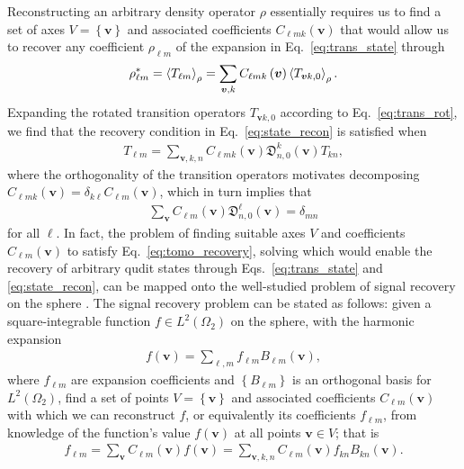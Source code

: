\documentclass[nofootinbib,notitlepage,twocolumn]{revtex4-2}
\newcommand{\p}[1]{\left(#1\right)} %
\renewcommand{\set}[1]{\left\{#1\right\}} %
\newcommand{\bk}{\Braket} %
\renewcommand{\v}{\bm} %
\newcommand{\1}{\mathds{1}}
\newcommand{\D}{\mathfrak{D}}
\begin{document}
Reconstructing an arbitrary density operator $\rho$ essentially requires us to find a set of axes $V=\set{\v v}$ and associated coefficients $C_{\ell mk}\p{\v v}$ that would allow us to recover any coefficient $\rho_{\ell m}$ of the expansion in Eq.~\eqref{eq:trans_state} through
\begin{align}
  \rho_{\ell m}^* = \bk{T_{\ell m}}_\rho
  = \sum_{\v v,k} C_{\ell mk}\p{\v v} \bk{T_{\v vk,0}}_\rho.
  \label{eq:state_recon}
\end{align}
Expanding the rotated transition operators $T_{\v vk,0}$ according to Eq.~\eqref{eq:trans_rot}, we find that the recovery condition in Eq.~\eqref{eq:state_recon} is satisfied when
\begin{align}
  T_{\ell m}
  = \sum_{\v v,k,n} C_{\ell mk}\p{\v v} \D^k_{n,0}\p{\v v} T_{kn},
\end{align}
where the orthogonality of the transition operators motivates decomposing $C_{\ell mk}\p{\v v}=\delta_{k\ell}C_{\ell m}\p{\v v}$, which in turn implies that
\begin{align}
  \sum_{\v v} C_{\ell m}\p{\v v} \D^\ell_{n,0}\p{\v v} = \delta_{mn}
  \label{eq:tomo_recovery}
\end{align}
for all $\ell$.
In fact, the problem of finding suitable axes $V$ and coefficients $C_{\ell m}\p{\v v}$ to satisfy Eq.~\eqref{eq:tomo_recovery}, solving which would enable the recovery of arbitrary qudit states through Eqs.~\eqref{eq:trans_state} and \eqref{eq:state_recon}, can be mapped onto the well-studied problem of signal recovery on the sphere \cite{driscoll1994computing, mcewen2011novel, mcewen2011sampling, khalid2014optimaldimensionality, rauhut2011sparse, alem2012sparse}.
The signal recovery problem can be stated as follows: given a square-integrable function $f\in L^2\p{\Omega_2}$ on the sphere, with the harmonic expansion
\begin{align}
  f\p{\v v} = \sum_{\ell,m} f_{\ell m} B_{\ell m}\p{\v v},
\end{align}
where $f_{\ell m}$ are expansion coefficients and $\set{B_{\ell m}}$ is an orthogonal basis for $L^2\p{\Omega_2}$, find a set of points $V=\set{\v v}$ and associated coefficients $C_{\ell m}\p{\v v}$ with which we can reconstruct $f$, or equivalently its coefficients $f_{\ell m}$, from knowledge of the function's value $f\p{\v v}$ at all points $\v v\in V$; that is
\begin{align}
  f_{\ell m} = \sum_{\v v} C_{\ell m}\p{\v v} f\p{\v v}
  = \sum_{\v v,k,n} C_{\ell m}\p{\v v} f_{kn} B_{kn}\p{\v v}.
\end{align}
\end{document}
